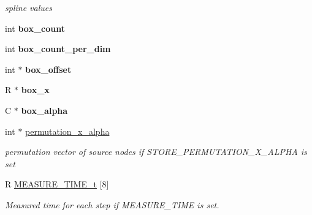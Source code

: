 \begin{DoxyCompactItemize}
\begin{DoxyCompactList}\small\item\em spline values \end{DoxyCompactList}\item 
\hypertarget{structfastsum__plan___a7dda1c8a3d19bd1779404008eae2d0af}{int {\bfseries box\-\_\-count}}\label{structfastsum__plan___a7dda1c8a3d19bd1779404008eae2d0af}

\item 
\hypertarget{structfastsum__plan___a811624e77b0a69624162dc128711cfdf}{int {\bfseries box\-\_\-count\-\_\-per\-\_\-dim}}\label{structfastsum__plan___a811624e77b0a69624162dc128711cfdf}

\item 
\hypertarget{structfastsum__plan___a6c2d81fd3daa6a1a511902968f8393de}{int $\ast$ {\bfseries box\-\_\-offset}}\label{structfastsum__plan___a6c2d81fd3daa6a1a511902968f8393de}

\item 
\hypertarget{structfastsum__plan___a92372bf9d41d30070f63cbf0f05566fb}{R $\ast$ {\bfseries box\-\_\-x}}\label{structfastsum__plan___a92372bf9d41d30070f63cbf0f05566fb}

\item 
\hypertarget{structfastsum__plan___a5ba196adf352db5950ef830fafb3bb9e}{C $\ast$ {\bfseries box\-\_\-alpha}}\label{structfastsum__plan___a5ba196adf352db5950ef830fafb3bb9e}

\item 
\hypertarget{structfastsum__plan___ac167affce85dc3d259c48cc55a16b12f}{int $\ast$ \hyperlink{structfastsum__plan___ac167affce85dc3d259c48cc55a16b12f}{permutation\-\_\-x\-\_\-alpha}}\label{structfastsum__plan___ac167affce85dc3d259c48cc55a16b12f}

\begin{DoxyCompactList}\small\item\em permutation vector of source nodes if S\-T\-O\-R\-E\-\_\-\-P\-E\-R\-M\-U\-T\-A\-T\-I\-O\-N\-\_\-\-X\-\_\-\-A\-L\-P\-H\-A is set \end{DoxyCompactList}\item 
\hypertarget{structfastsum__plan___a794d16be3bcb31e8d7a1fc012289da4d}{R \hyperlink{structfastsum__plan___a794d16be3bcb31e8d7a1fc012289da4d}{M\-E\-A\-S\-U\-R\-E\-\_\-\-T\-I\-M\-E\-\_\-t} \mbox{[}8\mbox{]}}\label{structfastsum__plan___a794d16be3bcb31e8d7a1fc012289da4d}

\begin{DoxyCompactList}\small\item\em Measured time for each step if M\-E\-A\-S\-U\-R\-E\-\_\-\-T\-I\-M\-E is set. \end{DoxyCompactList}\end{DoxyCompactItemize}


